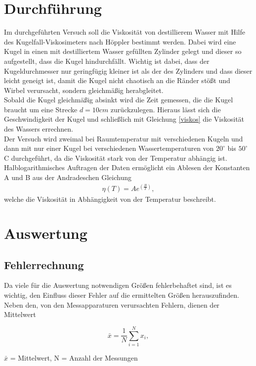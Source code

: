 	\section{Durchführung}
Im durchgeführten Versuch soll die Viskosität von destillierem Wasser mit Hilfe des Kugelfall-Viskosimeters nach Höppler bestimmt werden. Dabei wird eine Kugel in einen mit destilliertem Wasser gefüllten Zylinder gelegt und dieser so aufgestellt, dass die Kugel hindurchfällt. Wichtig ist dabei, dass der Kugeldurchmesser nur geringfügig kleiner ist als der des Zylinders und dass dieser leicht geneigt ist, damit die Kugel nicht chaotisch an die Ränder stößt und Wirbel verursacht, sondern gleichmäßig herabgleitet.\\
Sobald die Kugel gleichmäßig absinkt wird die Zeit gemessen, die die Kugel braucht um eine Strecke $d = 10cm$ zurückzulegen. Hieraus lässt sich die Geschwindigkeit der Kugel und schließlich mit Gleichung \eqref{viskos} die Viskosität des Wassers errechnen.\\
Der Versuch wird zweimal bei Raumtemperatur mit verschiedenen Kugeln und dann mit nur einer Kugel bei verschiedenen Wassertemperaturen von $20 ^\circ $ bis $50 ^\circ $ C durchgeführt, da die Viskosität stark von der Temperatur abhängig ist. Halblogarithmisches Auftragen der Daten ermöglicht ein Ablesen der Konstanten A und B aus der Andradeschen Gleichung
\begin{align}
	\eta(T)=Ae^{\left(\frac{B}{T}\right)},
	\label{andrade}
\end{align}
welche die Viskosität in Abhängigkeit von der Temperatur beschreibt.

\section{Auswertung}
\subsection{Fehlerrechnung}
Da viele für die Auswertung notwendigen Größen fehlerbehaftet sind, ist es wichtig, den Einfluss dieser Fehler auf die ermittelten
Größen herauszufinden. Neben den, von den Messapparaturen verursachten Fehlern, dienen der Mittelwert
\newpage
\begin{formel}
\begin{equation}
 \bar{x} = \frac1N \sum_{i=1}^{N} x_i,
\end{equation}
\caption*{\small{$\bar{x}$ = Mittelwert, N = Anzahl der Messungen}}
\end{formel}

